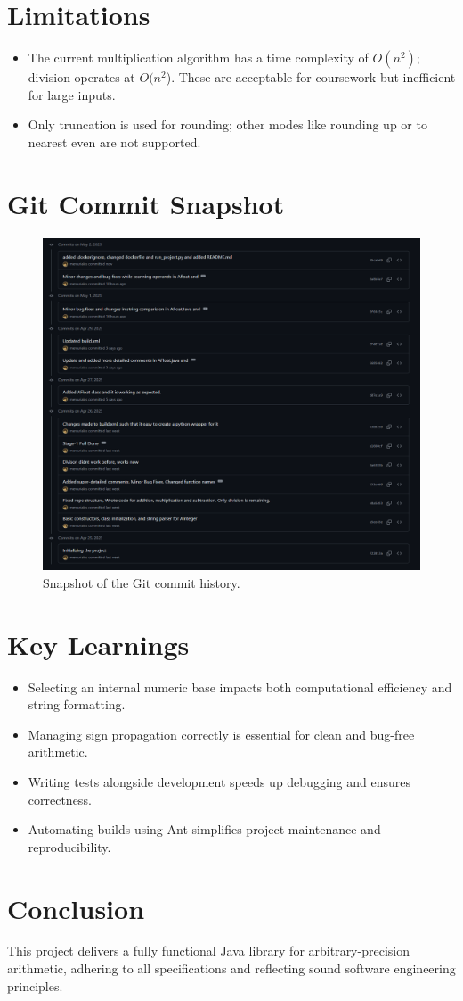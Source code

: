 \documentclass[12pt]{article}
\begin{document}
\section{Limitations}
\begin{itemize}
  \item The current multiplication algorithm has a time complexity of \(O(n^2)\); division operates at \(O(n^2 \)). These are acceptable for coursework but inefficient for large inputs.
  \item Only truncation is used for rounding; other modes like rounding up or to nearest even are not supported.
\end{itemize}

\section{Git Commit Snapshot}
\begin{figure}[h]
  \centering
  \includegraphics[width=0.9\linewidth]{image.png}
  \caption{Snapshot of the Git commit history.}
  \label{fig:git}
\end{figure}

\section{Key Learnings}
\begin{itemize}
  \item Selecting an internal numeric base impacts both computational efficiency and string formatting.
  \item Managing sign propagation correctly is essential for clean and bug-free arithmetic.
  \item Writing tests alongside development speeds up debugging and ensures correctness.
  \item Automating builds using Ant simplifies project maintenance and reproducibility.
\end{itemize}

\section{Conclusion}
This project delivers a fully functional Java library for arbitrary-precision arithmetic, adhering to all specifications and reflecting sound software engineering principles.
\end{document}
